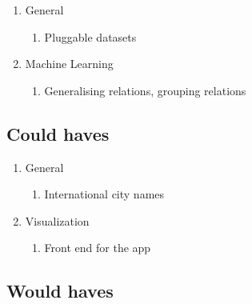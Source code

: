\begin{enumerate}
    \item{General}
    \begin{enumerate}
        \item Pluggable datasets
    \end{enumerate}
    
    \item{Machine Learning}  
    \begin{enumerate}
        \item Generalising relations, grouping relations
    \end{enumerate}
\end{enumerate}


\subsection {Could haves}

\begin{enumerate}
    \item{General}
    \begin{enumerate}
        \item International city names
    \end{enumerate}
    
    \item{Visualization}    
    \begin{enumerate}
        \item Front end for the app
    \end{enumerate}
\end{enumerate}

\subsection {Would haves}